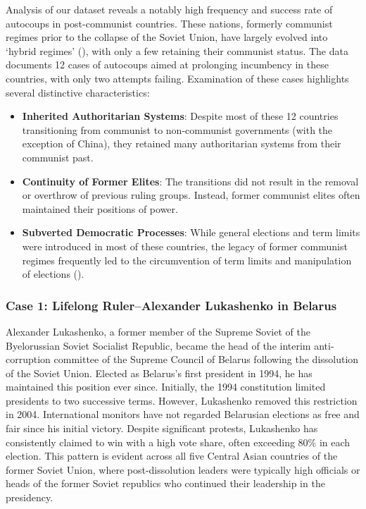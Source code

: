 \documentclass[
  12pt,
]{report}
\begin{document}
Analysis of our dataset reveals a notably high frequency and success
rate of autocoups in post-communist countries. These nations, formerly
communist regimes prior to the collapse of the Soviet Union, have
largely evolved into `hybrid regimes'
(), with only a
few retaining their communist status. The data documents 12 cases of
autocoups aimed at prolonging incumbency in these countries, with only
two attempts failing. Examination of these cases highlights several
distinctive characteristics:

\begin{itemize}
\item
  \textbf{Inherited Authoritarian Systems}: Despite most of these 12
  countries transitioning from communist to non-communist governments
  (with the exception of China), they retained many authoritarian
  systems from their communist past.
\item
  \textbf{Continuity of Former Elites}: The transitions did not result
  in the removal or overthrow of previous ruling groups. Instead, former
  communist elites often maintained their positions of power.
\item
  \textbf{Subverted Democratic Processes}: While general elections and
  term limits were introduced in most of these countries, the legacy of
  former communist regimes frequently led to the circumvention of term
  limits and manipulation of elections
  ().
\end{itemize}

\subsubsection*{Case 1: Lifelong Ruler--Alexander Lukashenko in
Belarus}\label{case-1-lifelong-ruleralexander-lukashenko-in-belarus}

Alexander Lukashenko, a former member of the Supreme Soviet of the
Byelorussian Soviet Socialist Republic, became the head of the interim
anti-corruption committee of the Supreme Council of Belarus following
the dissolution of the Soviet Union. Elected as Belarus's first
president in 1994, he has maintained this position ever since.
Initially, the 1994 constitution limited presidents to two successive
terms. However, Lukashenko removed this restriction in 2004.
International monitors have not regarded Belarusian elections as free
and fair since his initial victory. Despite significant protests,
Lukashenko has consistently claimed to win with a high vote share, often
exceeding 80\% in each election. This pattern is evident across all five
Central Asian countries of the former Soviet Union, where
post-dissolution leaders were typically high officials or heads of the
former Soviet republics who continued their leadership in the
presidency.
\end{document}
